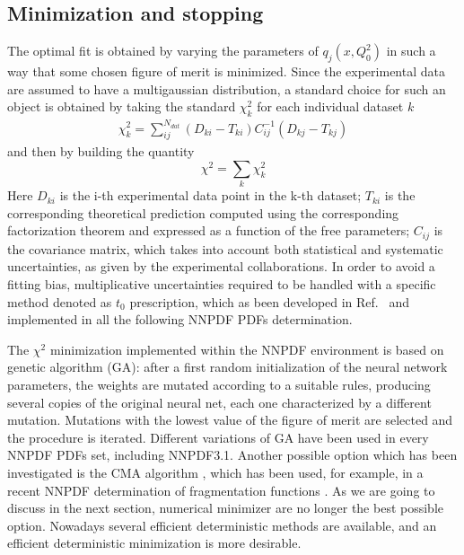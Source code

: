 \subsection{Minimization and stopping}
\label{sec:minimization}
The optimal fit is obtained by varying the parameters of $q_j\left(x,Q_0^2\right)$  in such a way that 
some chosen figure of merit is minimized. 
Since the experimental data are assumed to have a multigaussian
distribution, a standard choice for such an object is obtained by taking the standard $\chi^2_k $ for each individual 
dataset $k$
\begin{align}
    \label{eq:chi2}
    \chi^2_k 
    =\sum_{ij}^{N_{dat}}\left(D_{ki}-T_{ki}\right)C_{ij}^{-1}\left(D_{kj}-T_{kj}\right)
\end{align}
and then by building the quantity
\begin{equation}
\label{tot chi2}
\chi^2=\sum_k \chi^2_k
\end{equation}
Here $D_{ki}$ is the i-th experimental data point in the k-th dataset; $T_{ki}$ is the corresponding 
theoretical prediction computed using the corresponding factorization theorem and 
expressed as a function of the free parameters; 
$C_{ij}$ is the covariance matrix, which takes into account both statistical and systematic uncertainties,
as given by the experimental collaborations.
In order to avoid a fitting bias, multiplicative uncertainties required to be handled with a specific method
denoted as $t_0$ prescription, which as been developed in Ref.~\cite{Ball:2009qv} and implemented in all the following
NNPDF PDFs determination.

%
The $\chi^2$ minimization implemented within the NNPDF environment is based on genetic algorithm (GA):
after a first random initialization of the neural network parameters,
the weights are mutated according to a suitable rules, producing
several copies of the original neural net, each one characterized by a different mutation.
Mutations with the lowest value of the figure of merit are selected and the procedure is iterated.
Different variations of GA have been used in every NNPDF PDFs set, including NNPDF3.1.
Another possible option which has been investigated is the CMA algorithm \cite{DBLP:journals/corr/Hansen16a},
which has been used, for example, in a recent NNPDF determination of 
fragmentation functions \cite{Bertone:2017tyb}. As we are going to discuss in the next section,
numerical minimizer are no longer the best possible option. Nowadays several efficient deterministic
methods are available, and an efficient deterministic minimization is more desirable. 

